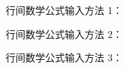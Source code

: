 \documentclass[a5paper,12pt]{ctexart}
\begin{document}
行间数学公式输入方法 1：

行间数学公式输入方法 2：

行间数学公式输入方法 3：
\end{document}
